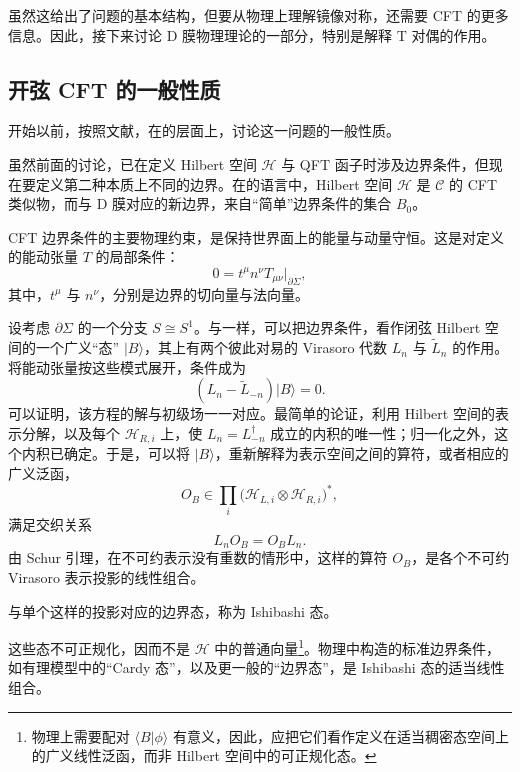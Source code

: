 虽然这给出了问题的基本结构，但要从物理上理解镜像对称，还需要 CFT 的更多信息。因此，接下来讨论 D 膜物理理论的一部分，特别是解释 T 对偶的作用。

\subsection{开弦 CFT 的一般性质}\label{sec:3.5.2}

开始以前，按照文献，在的层面上，讨论这一问题的一般性质。

虽然前面的讨论，已在定义 Hilbert 空间 $\mathcal{H}$ 与 QFT 函子时涉及边界条件，但现在要定义第二种本质上不同的边界。在的语言中，Hilbert 空间 $\mathcal{H}$ 是 $\mathcal{C}$ 的 CFT 类似物，而与 D 膜对应的新边界，来自“简单”边界条件的集合 $B_0$。

CFT 边界条件的主要物理约束，是保持世界面上的能量与动量守恒。这是对定义的能动张量 $T$ 的局部条件：
\begin{equation}\label{eq:3.135}
0=t^\mu n^\nu T_{\mu\nu}\big|_{\partial\Sigma},
\end{equation}
其中，$t^\mu$ 与 $n^\nu$，分别是边界的切向量与法向量。

设考虑 $\partial\Sigma$ 的一个分支 $S\cong S^1$。与一样，可以把边界条件，看作闭弦 Hilbert 空间的一个广义“态” $|B\rangle$，其上有两个彼此对易的 Virasoro 代数 $L_n$ 与 $\widetilde L_n$ 的作用。将能动张量按这些模式展开，条件成为
\begin{equation}\label{eq:3.136}
(L_n-\widetilde L_{-n})|B\rangle=0.
\end{equation}
可以证明，该方程的解与初级场一一对应。最简单的论证，利用 Hilbert 空间的表示分解，以及每个 $\mathcal{H}_{R,i}$ 上，使 $L_n=L_{-n}^\dagger$ 成立的内积的唯一性；归一化之外，这个内积已确定。于是，可以将 $|B\rangle$，重新解释为表示空间之间的算符，或者相应的广义泛函，
\begin{equation}\label{eq:3.137}
O_B\in\prod_i
\bigl(\mathcal{H}_{L,i}\otimes\mathcal{H}_{R,i}\bigr)^*,
\end{equation}
满足交织关系
\[
L_nO_B=O_BL_n.
\]
由 Schur 引理，在不可约表示没有重数的情形中，这样的算符 $O_B$，是各个不可约 Virasoro 表示投影的线性组合。
\begin{definition*}\label{def:3.ishibashi-state}
与单个这样的投影对应的边界态，称为 Ishibashi 态。
\end{definition*}
这些态不可正规化，因而不是 $\mathcal{H}$ 中的普通向量\footnote{物理上需要配对 $\langle B|\phi\rangle$ 有意义，因此，应把它们看作定义在适当稠密态空间上的广义线性泛函，而非 Hilbert 空间中的可正规化态。}。物理中构造的标准边界条件，如有理模型中的“Cardy 态”，以及更一般的“边界态”，是 Ishibashi 态的适当线性组合。

